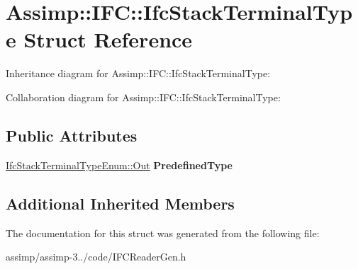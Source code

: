 \hypertarget{struct_assimp_1_1_i_f_c_1_1_ifc_stack_terminal_type}{\section{Assimp\+:\+:I\+F\+C\+:\+:Ifc\+Stack\+Terminal\+Type Struct Reference}
\label{struct_assimp_1_1_i_f_c_1_1_ifc_stack_terminal_type}
}


Inheritance diagram for Assimp\+:\+:I\+F\+C\+:\+:Ifc\+Stack\+Terminal\+Type\+:


Collaboration diagram for Assimp\+:\+:I\+F\+C\+:\+:Ifc\+Stack\+Terminal\+Type\+:
\subsection*{Public Attributes}
\begin{DoxyCompactItemize}
\item 
\hypertarget{struct_assimp_1_1_i_f_c_1_1_ifc_stack_terminal_type_a85ad8dd16ff16a18d19c5c1466cd7bb4}{\hyperlink{classboost_1_1shared__ptr}{Ifc\+Stack\+Terminal\+Type\+Enum\+::\+Out} {\bfseries Predefined\+Type}}\label{struct_assimp_1_1_i_f_c_1_1_ifc_stack_terminal_type_a85ad8dd16ff16a18d19c5c1466cd7bb4}

\end{DoxyCompactItemize}
\subsection*{Additional Inherited Members}


The documentation for this struct was generated from the following file\+:\begin{DoxyCompactItemize}
\item 
assimp/assimp-\/3../code/I\+F\+C\+Reader\+Gen.\+h\end{DoxyCompactItemize}
